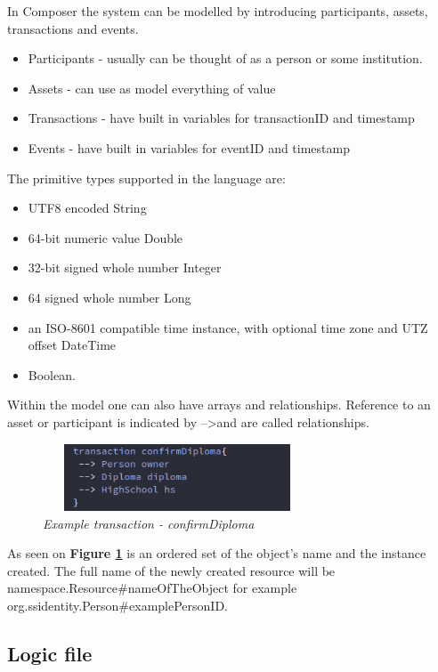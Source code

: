 \documentclass[a4paper,11pt]{report}
\begin{document}
In Composer the system can be modelled by introducing participants, assets, transactions and events. 
\begin{itemize}

\item Participants - usually can be thought of as a person or some institution.
\item Assets - can use as model everything of value
\item Transactions - have built in variables for transactionID and timestamp 
\item Events - have built in variables for eventID and timestamp

\end{itemize}

The primitive types supported in the language are:
\begin{itemize}

\item UTF8 encoded String 
\item 64-bit numeric value Double 
\item 32-bit signed whole number Integer 
\item 64 signed whole number Long
\item an ISO-8601 compatible time instance, with optional time zone and UTZ offset DateTime 
\item Boolean. 

\end{itemize}
Within the model one can also have arrays and relationships. Reference to an asset or participant is indicated by --\textgreater and are called relationships.

\begin{figure}[h]
\centering
  \includegraphics[height = 2cm ,width = 8cm]{transaction.png}
  \caption{\textit{Example transaction - confirmDiploma}}
  \label{transactionRelationship}
\end{figure}

As seen on \textbf{Figure \ref{transactionRelationship}} is an ordered set of the object’s name and the instance created. The full name of the newly created resource will be namespace.Resource\#nameOfTheObject for example org.ssidentity.Person\#examplePersonID.

\subsection{Logic file}
\end{document}
